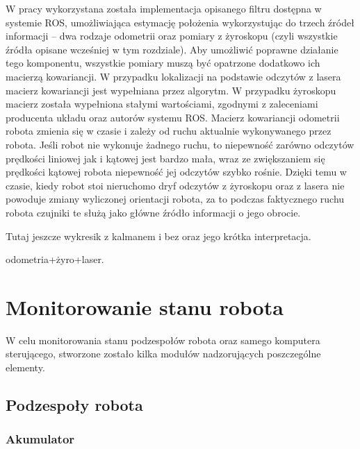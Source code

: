 W pracy wykorzystana została implementacja opisanego filtru dostępna w systemie ROS,
umożliwiająca estymację położenia wykorzystując do trzech źródeł informacji -- dwa rodzaje
odometrii oraz pomiary z żyroskopu (czyli wszystkie źródła opisane wcześniej w tym rozdziale).
Aby umożliwić poprawne działanie tego komponentu, wszystkie pomiary muszą być opatrzone
dodatkowo ich macierzą kowariancji. W przypadku lokalizacji na podstawie odczytów z lasera
macierz kowariancji jest wypełniana przez algorytm. W przypadku żyroskopu macierz
została wypełniona stałymi wartościami, zgodnymi z zaleceniami producenta układu oraz
autorów systemu ROS. Macierz kowariancji odometrii robota zmienia się w czasie i zależy
od ruchu aktualnie wykonywanego przez robota. Jeśli robot nie wykonuje żadnego ruchu,
to niepewność zarówno odczytów prędkości liniowej jak i kątowej jest bardzo mała,
wraz ze zwiększaniem się prędkości kątowej robota niepewność jej odczytów szybko rośnie.
Dzięki temu w czasie, kiedy robot stoi nieruchomo dryf odczytów z żyroskopu oraz z lasera
nie powoduje zmiany wyliczonej orientacji robota, za to podczas faktycznego ruchu robota
czujniki te służą jako główne źródło informacji o jego obrocie.

Tutaj jeszcze wykresik z kalmanem i bez oraz jego krótka interpretacja.

odometria+żyro+laser.

\section{Monitorowanie stanu robota}

W celu monitorowania stanu podzespołów robota oraz samego komputera sterującego,
stworzone zostało kilka modułów nadzorujących poszczególne elementy.

\subsection{Podzespoły robota}

\subsubsection{Akumulator}

